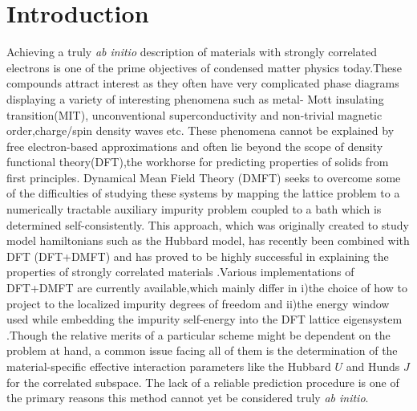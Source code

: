 \documentclass[10pt]{ruthesis}
\begin{document}
{\section{Introduction}
 Achieving a truly \emph{ab initio} description of  materials with strongly correlated electrons is one of the prime objectives of condensed matter physics today.These compounds attract interest as they often have very complicated phase diagrams displaying a variety of interesting phenomena such as  metal- Mott insulating transition(MIT), unconventional superconductivity and non-trivial magnetic order,charge/spin density waves etc\cite{RMP_MIT_1998_Imada}. These phenomena cannot be explained by free electron-based approximations and often lie beyond the scope of density functional theory(DFT),the workhorse for predicting properties of solids from first principles\cite{RMP_dft_review_1989_R_O_Jones}. Dynamical Mean Field Theory (DMFT) seeks to overcome some of the difficulties of studying these systems by mapping the lattice problem to a numerically tractable auxiliary impurity problem coupled to a bath which is determined self-consistently. This approach, which was originally created to study model hamiltonians such as the Hubbard model, has recently been combined with DFT (DFT+DMFT) and has proved to be highly successful in explaining the properties of strongly correlated materials \cite{RMP_LDA+DMFT_2006_G.K}.Various implementations of DFT+DMFT are currently available\cite{PRB_Wannier_Downfolding_2006_D.Vollhardt,PRB_Wannier_Downfolding_2006_O.K.Andersen,PRB_localorbital_Downfolding_2008_Lichtenstein,PRB_dmft_wien2k_2010_Chuck_Haule,PRB_LaFeAsO_2010_A.Georges,PRB_covalency_TMoxides_2014_k.Haule},which mainly differ in i)the choice of how to project to the localized impurity degrees of freedom and ii)the energy window used while embedding the impurity self-energy into the DFT lattice eigensystem .Though the relative merits of a particular scheme might be dependent on the problem at hand, a common issue facing all of them is the determination of the material-specific effective interaction parameters like the Hubbard $U$ and Hunds $J$ for the correlated subspace. The lack of a reliable prediction procedure is one of the primary reasons this method cannot yet be considered truly \emph{ab initio}.

}
\end{document}
